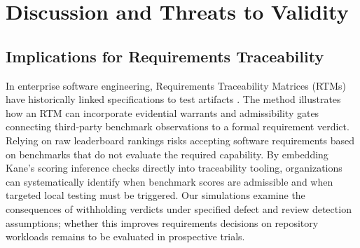 \documentclass[runningheads]{llncs}
\begin{document}
\section{Discussion and Threats to Validity}
\label{sec:threats}

\subsection{Implications for Requirements Traceability}
In enterprise software engineering, Requirements Traceability Matrices (RTMs) have historically linked specifications to test artifacts \cite{cleland_huang_traceability_2012,gotel_traceability_1994}. The method illustrates how an RTM can incorporate evidential warrants and admissibility gates connecting third-party benchmark observations to a formal requirement verdict. Relying on raw leaderboard rankings risks accepting software requirements based on benchmarks that do not evaluate the required capability. By embedding Kane's scoring inference checks directly into traceability tooling, organizations can systematically identify when benchmark scores are admissible and when targeted local testing must be triggered. Our simulations examine the consequences of withholding verdicts under specified defect and review detection assumptions; whether this improves requirements decisions on repository workloads remains to be evaluated in prospective trials.
\end{document}
